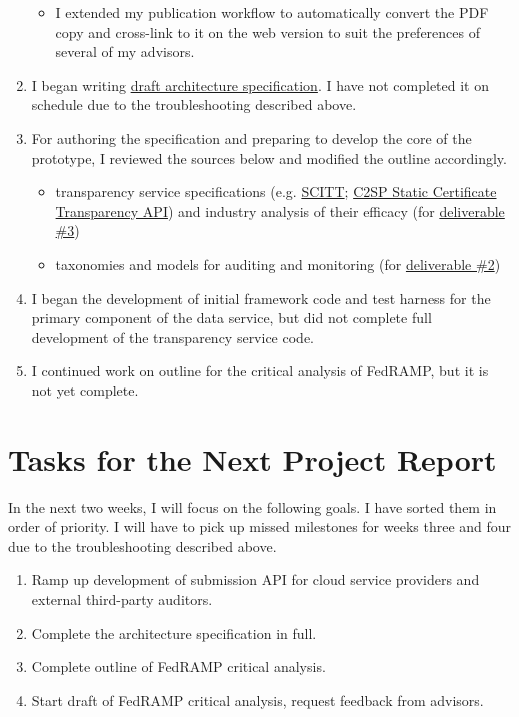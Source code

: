 \documentclass{jdf}
\begin{document}
\begin{enumerate}
\begin{itemize}
            \item I extended my publication workflow to automatically convert the PDF copy and cross-link to it on the web version to suit the preferences of several of my advisors.
        \end{itemize}
    \item I began writing \hyperlink{https://add-architecture-draft--conmotion.netlify.app/architecture.html}{draft architecture specification}. I have not completed it on schedule due to the troubleshooting described above.
    \item For authoring the specification and preparing to develop the core of the prototype, I reviewed the sources below and modified the outline accordingly.
        \begin{itemize}
            \item transparency service specifications (e.g. \hyperlink{https://datatracker.ietf.org/doc/draft-ietf-scitt-architecture/}{SCITT}; \hyperlink{https://c2sp.org/static-ct-api}{C2SP Static Certificate Transparency API}) and industry analysis of their efficacy (for  \hyperlink{https://github.com/aj-stein/practicum_proposal/blob/main/paper.pdf}{deliverable \#3})
            \item taxonomies and models for auditing and monitoring (for  \hyperlink{https://github.com/aj-stein/practicum_proposal/blob/main/paper.pdf}{deliverable \#2})
        \end{itemize}
    \item I began the development of initial framework code and test harness for the primary component of the data service, but did not complete full development of the transparency service code.
    \item I continued work on outline for the critical analysis of FedRAMP, but it is not yet complete.
\end{enumerate}

\section*{Tasks for the Next Project Report}

In the next two weeks, I will focus on the following goals. I have sorted them in order of priority. I will have to pick up missed milestones for weeks three and four due to the troubleshooting described above.

\begin{enumerate}
    \item Ramp up development of submission API for cloud service providers and external third-party auditors.
    \item Complete the architecture specification in full.
    \item Complete outline of FedRAMP critical analysis.
    \item Start draft of FedRAMP critical analysis, request feedback from advisors.
\end{enumerate}
\end{document}

